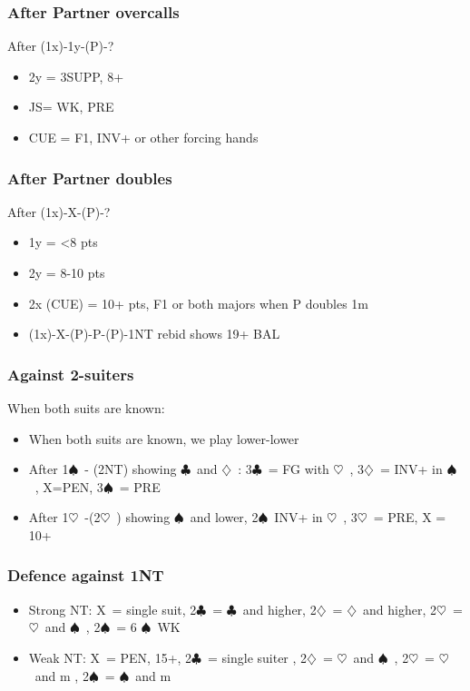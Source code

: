 \documentclass{article}
\newcommand\C{\ensuremath{\clubsuit}}
\newcommand\D{\ensuremath{\diamondsuit}}
\renewcommand\H{\ensuremath{\heartsuit}}
\renewcommand\S{\ensuremath{\spadesuit}}
\newcommand\X{{\footnotesize X}}
\begin{document}
\begin{multicols}{2}
  \subsubsection{After Partner overcalls}
  After (1x)-1y-(P)-?
  \begin{itemize}
    \item 2y = 3SUPP, 8+
     \item JS= WK, PRE
     \item CUE = F1, INV+ or other forcing hands
  \end{itemize}
  \subsubsection{After Partner doubles}
  After (1x)-X-(P)-?
  \begin{itemize}
    \item 1y = <8 pts
    \item 2y = 8-10 pts
    \item 2x (CUE) = 10+ pts, F1 or both majors when P doubles 1m
     \item (1x)-X-(P)-P-(P)-1NT rebid shows 19+ BAL
  \end{itemize}
  \subsubsection{Against 2-suiters}
  \label{twosdefence}
  When both suits are known:
  \begin{itemize}
    \item When both suits are known, we play lower-lower
    \item After 1\S\ - (2NT) showing \C\ and \D\ : 3\C\ = FG with \H\ , 3\D\ = INV+ in \S\ , X=PEN, 3\S\ = PRE
    \item After 1\H\ -(2\H\ ) showing \S\ and lower, 2\S\ INV+ in \H\ , 3\H\ = PRE, X = 10+ 
    \end{itemize}
  \subsubsection{Defence against 1NT}
  \label{oneNTdef}
  \begin{itemize}
    \item Strong NT: \X\ = single suit, 2\C\ = \C\ and higher, 2\D\ = \D\ and higher, 2\H\ = \H\ and \S\ , 2\S\ = 6 \S\ WK
    \item Weak NT: \X\ = PEN, 15+, 2\C\ = single suiter , 2\D\ = \H\ and \S\ , 2\H\ = \H\ and m , 2\S\ =  \S\ and m
    \end{itemize}
\end{multicols}
\end{document}
